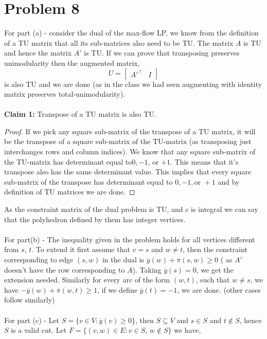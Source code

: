 \documentclass{article}
\numberwithin{equation}{section}
\begin{document}
\section{Problem 8} %
For part (a) - consider the dual of the max-flow LP, we know from the definition of a TU matrix that all its sub-matrices also need to be TU. The matrix $A$ is TU and hence the matrix $A'$ is TU. If we can prove that transposing preserves unimodularity then the augmented matrix, 
\begin{equation}
    U = \begin{bmatrix}
        A'^\top& I
    \end{bmatrix}
\end{equation}
is also TU and we are done (as in the class we had seen augmenting with identity matrix preserves total-unimodularity).\\\\
\textbf{Claim 1:} Transpose of a TU matrix is also TU. 
\begin{proof}
    If we pick any square sub-matrix of the transpose of a TU matrix, it will be the transpose of a square sub-matrix of the TU-matrix (as transposing just interchanges rows and column indices). We know that any square sub-matrix of the TU-matrix has determinant equal to$ 0, -1$, or  $+1$. This means that it's transpose also has the same determinant value. This implies that every square sub-matrix of the transpose has determinant equal to $0, -1,\text{or } +1$ and by definition of TU matrices we are done. 
\end{proof}
As the constraint matrix of the dual problem is TU, and $c$ is integral we can say that the polyhedron defined by them has integer vertices. \\\\
For part(b) - The inequality given in the problem holds for all vertices different from $s$, $t$. To extend it first assume that $v=s$ and $w\not=t$, then the constraint corresponding to edge $(s, w)$ in the dual is $\overline{y}(w) + \overline{\pi}(s, w) \ge 0$ ( as $A'$ doesn't have the row corresponding to $A$). Taking $\overline{y}(s)=0$, we get the extension needed. Similarly for every arc of the form $(w, t)$, such that $w\not=s$, we have $-\overline{y}(w) +\overline{\pi}(w, t) \ge 1$, if we define  $\overline{y}(t)=-1$, we are done. (other cases follow similarly)\\\\
For part (c) - Let $S = \{v \in V: \overline{y}(v) \ge 0\}$, then $S\subseteq V$ and $s \in S$ and $t\notin S$, hence $S$ is a valid cut. Let $F = \{(v, w) \in E : v\in S, \, w\notin S\}$ we have, 
\end{document}
